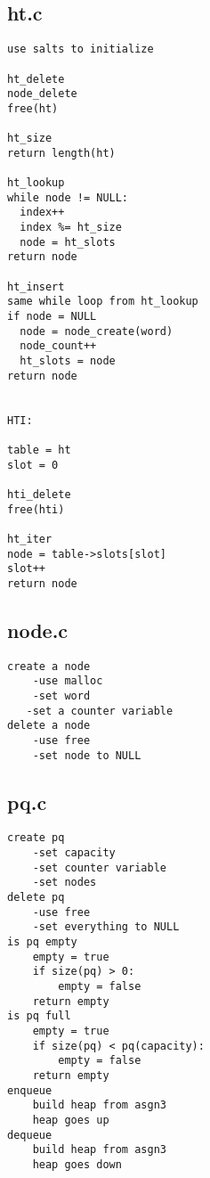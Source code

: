 \documentclass[12pt]{article}
\begin{document}
\subsection{\textbf{ht.c}}
\begin{verbatim}
use salts to initialize

ht_delete
node_delete
free(ht)

ht_size
return length(ht)

ht_lookup
while node != NULL:
  index++
  index %= ht_size
  node = ht_slots
return node

ht_insert
same while loop from ht_lookup
if node = NULL
  node = node_create(word)
  node_count++
  ht_slots = node
return node


HTI:

table = ht
slot = 0

hti_delete
free(hti)

ht_iter
node = table->slots[slot]
slot++
return node
\end{verbatim}

\subsection{\textbf{node.c}}
\begin{verbatim}
create a node
    -use malloc
    -set word
   -set a counter variable
delete a node
    -use free
    -set node to NULL
\end{verbatim}

\subsection{\textbf{pq.c}}
\begin{verbatim}
create pq
    -set capacity
    -set counter variable
    -set nodes
delete pq
    -use free
    -set everything to NULL
is pq empty
    empty = true
    if size(pq) > 0:
        empty = false
    return empty
is pq full
    empty = true
    if size(pq) < pq(capacity):
        empty = false
    return empty
enqueue
    build heap from asgn3
    heap goes up
dequeue
    build heap from asgn3
    heap goes down
\end{verbatim}
\end{document}
